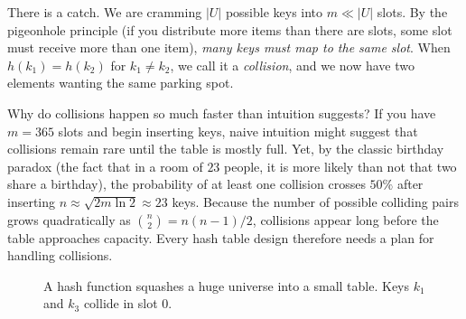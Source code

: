 There is a catch. We are cramming $|U|$ possible keys into $m \ll |U|$ slots. By the pigeonhole principle (if you distribute more items than there are slots, some slot must receive more than one item), \emph{many keys must map to the same slot}. When $h(k_1) = h(k_2)$ for $k_1 \neq k_2$, we call it a \emph{collision}, and we now have two elements wanting the same parking spot.

Why do collisions happen so much faster than intuition suggests? If you have $m = 365$ slots and begin inserting keys, naive intuition might suggest that collisions remain rare until the table is mostly full. Yet, by the classic birthday paradox (the fact that in a room of $23$ people, it is more likely than not that two share a birthday), the probability of at least one collision crosses $50\%$ after inserting $n \approx \sqrt{2m \ln 2} \approx 23$ keys. Because the number of possible colliding pairs grows quadratically as $\binom{n}{2} = n(n-1)/2$, collisions appear long before the table approaches capacity. Every hash table design therefore needs a plan for handling collisions.

\begin{figure}[h]
\centering
{}
\caption{A hash function squashes a huge universe into a small table. Keys $k_1$ and $k_3$ collide in slot $0$.}
\label{ch11:hashing-picture}
\end{figure}


